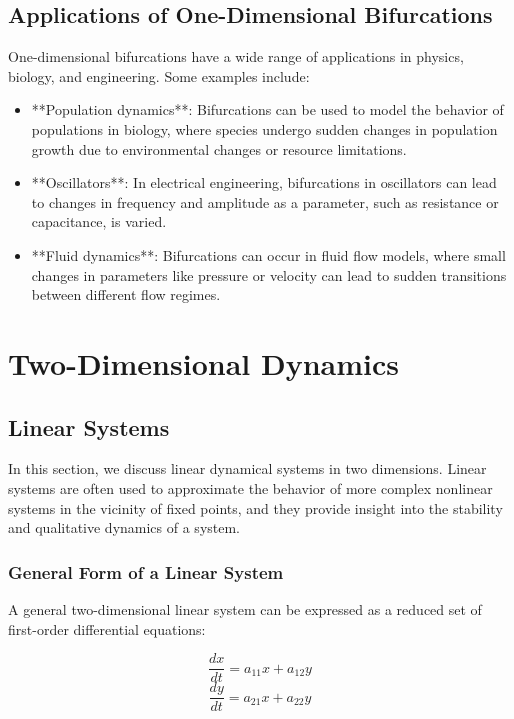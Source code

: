 \documentclass{amsbook}
\begin{document}
\section{Applications of One-Dimensional Bifurcations}

One-dimensional bifurcations have a wide range of applications in physics, biology, and engineering. Some examples include:

\begin{itemize}
    \item **Population dynamics**: Bifurcations can be used to model the behavior of populations in biology, where species undergo sudden changes in population growth due to environmental changes or resource limitations.
    \item **Oscillators**: In electrical engineering, bifurcations in oscillators can lead to changes in frequency and amplitude as a parameter, such as resistance or capacitance, is varied.
    \item **Fluid dynamics**: Bifurcations can occur in fluid flow models, where small changes in parameters like pressure or velocity can lead to sudden transitions between different flow regimes.
\end{itemize}


\chapter{Two-Dimensional Dynamics}

\section{Linear Systems}
In this section, we discuss linear dynamical systems in two dimensions. Linear systems are often used to approximate the behavior of more complex nonlinear systems in the vicinity of fixed points, and they provide insight into the stability and qualitative dynamics of a system.

\subsection{General Form of a Linear System}

A general two-dimensional linear system can be expressed as a reduced set of first-order differential equations:

\[
\frac{dx}{dt} = a_{11}x + a_{12}y
\]
\[
\frac{dy}{dt} = a_{21}x + a_{22}y
\]
\end{document}
